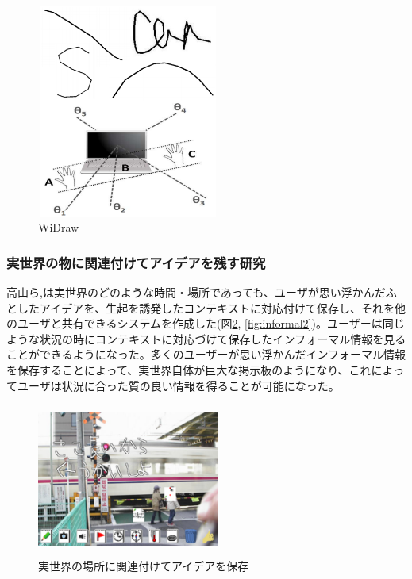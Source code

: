 \documentclass[11pt,a4j, titlepage]{jarticle} %
\begin{document}
\begin{figure}[H]
  \begin{center}
    \includegraphics[clip,height=7.0cm,width=6.0cm]{./widraw.eps}
    \caption{WiDraw}
    \label{fig:widraw}
  \end{center}
\end{figure}


\subsubsection{実世界の物に関連付けてアイデアを残す研究}
高山ら\cite{tano},\cite{tano2}は実世界のどのような時間・場所であっても、ユーザが思い浮かんだふとしたアイデアを、生起を誘発したコンテキストに対応付けて保存し、それを他のユーザと共有できるシステムを作成した(図\ref{fig:informal}, \ref{fig:informal2})。ユーザーは同じような状況の時にコンテキストに対応づけて保存したインフォーマル情報を見ることができるようになった。多くのユーザーが思い浮かんだインフォーマル情報を保存することによって、実世界自体が巨大な掲示板のようになり、これによってユーザは状況に合った質の良い情報を得ることが可能になった。

\begin{figure}[H]
  \begin{center}
    \includegraphics[clip,height=5.0cm,width=6.0cm]{./informal.eps}
    \caption{実世界の場所に関連付けてアイデアを保存}
    \label{fig:informal}
  \end{center}
\end{figure}
\end{document}
